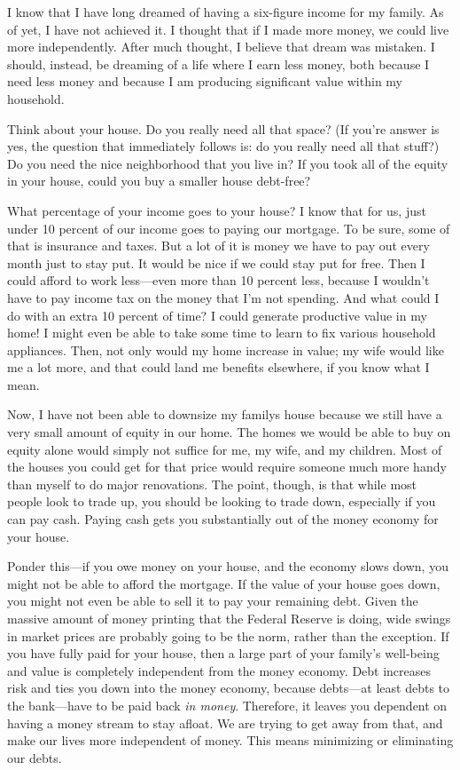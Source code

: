 I know that I have long dreamed of having a six-figure income for my
family. As of yet, I have not achieved it. I thought that if I made
more money, we could live more independently. After much thought, I
believe that dream was mistaken. I should, instead, be dreaming of a
life where I earn less money, both because I need less money and
because I am producing significant value within my household.

Think about your house. Do you really need all that space?
(If you’re answer is
yes, the question that immediately follows is: do you really need all
that stuff?) Do you need the nice neighborhood that you live in?  If
you took all of the equity in your house, could you buy a smaller house
debt-free?

What percentage of your income goes to your house?  I know that for us,
just under 10 percent of our income goes to paying our mortgage. To be
sure, some of that is insurance and taxes. But a lot of it is money we
have to pay out every month just to stay put. It would be nice if we
could stay put for free. Then I could afford to work less—even more
than 10 percent less, because I wouldn’t have to pay income tax on the
money that I’m not spending. And what could I do with an extra 10
percent of time? I could generate productive value in my home! I might
even be able to take some time to learn to fix various household
appliances. Then, not only would my home increase in value; my wife
would like me a lot more, and that could land me benefits elsewhere, if
you know what I mean.

Now, I have not been able to downsize my family{\textquotesingle}s house
because we still have a very small amount of equity in our home. The
homes we would be able to buy on equity alone would simply not suffice
for me, my wife, and my children. Most of the houses you could get for
that price would require someone much more handy than myself to do
major renovations. The point, though, is that while most people look to
trade up, you should be looking to trade down, especially if you can
pay cash. Paying cash gets you substantially out of the money economy
for your house.

Ponder this—if you owe money on your house, and the economy slows down,
you might not be able to afford the mortgage. If the value of your
house goes down, you might not even be able to sell it to pay your
remaining debt. Given the massive amount of money printing that the
Federal Reserve is doing, wide swings in market prices are probably
going to be the norm, rather than the exception. If you have fully paid
for your house, then a large part of your family’s well-being and value
is completely independent from the money economy. Debt increases risk
and ties you down into the money economy, because debts—at least debts
to the bank—have to be paid back \textit{in money}.  Therefore, it
leaves you dependent on having a money stream to stay afloat.  We are
trying to get away from that, and make our lives more independent of
money.  This means minimizing or eliminating our debts.

